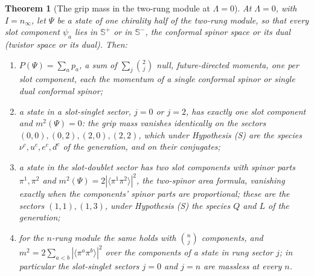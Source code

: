 \documentclass[11pt]{article}
\newtheorem{theorem}{Theorem}[section]
\theoremstyle{definition}
\theoremstyle{plain}
\newcommand{\changedmark}[2]{\marginpar{\raggedright\scriptsize\color{#1}#2}}
\providecommand{\CS}{}\renewcommand{\CS}{{\mathbb{S}^{+}}}
\providecommand{\CSm}{}\renewcommand{\CSm}{{\mathbb{S}^{-}}}
\providecommand{\br}{}\renewcommand{\br}[1]{\langle #1\rangle}
\begin{document}
\begin{theorem}[The grip mass in the two-rung module at $\Lambda = 0$]\label{c:standard-model.grip-mass-two-rung-module}
\changedmark{gray}{reworded}
At $\Lambda = 0$, with $I = n_{\infty}$, let $\Psi$ be a state of one chirality half of the two-rung module, so that every slot component $\psi_{a}$ lies in $\CS$ or in $\CSm{}$, the conformal spinor space or its dual (twistor space or its dual). Then:
\begin{enumerate}
\item[(i)] $P(\Psi) = \sum_{a} p_{a}$, a sum of $\sum_{j}\binom{2}{j}$ null, future-directed momenta, one per slot component, each the momentum of a single conformal spinor or single dual conformal spinor;
\item[(ii)] a state in a slot-singlet sector, $j = 0$ or $j = 2$, has exactly one slot component and $m^{2}(\Psi) = 0$: the grip mass vanishes identically on the sectors $(0,0), (0,2), (2,0), (2,2)$, which under Hypothesis (S) are the species $\nu^{c}, u^{c}, e^{c}, d^{c}$ of the generation, and on their conjugates;
\item[(iii)] a state in the slot-doublet sector has two slot components with spinor parts $\pi^{1}, \pi^{2}$ and $m^{2}(\Psi) = 2|\br{\pi^{1}\pi^{2}}|^{2}$, the two-spinor area formula, vanishing exactly when the components' spinor parts are proportional; these are the sectors $(1,1), (1,3)$, under Hypothesis (S) the species $Q$ and $L$ of the generation;
\item[(iv)] for the $n$-rung module the same holds with $\binom{n}{j}$ components, and $m^{2} = 2\sum_{a < b}|\br{\pi^{a}\pi^{b}}|^{2}$ over the components of a state in rung sector $j$; in particular the slot-singlet sectors $j = 0$ and $j = n$ are massless at every $n$.
\end{enumerate}
\end{theorem}
\end{document}
